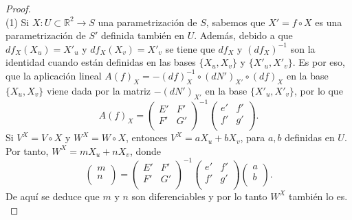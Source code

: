 \begin{proof}	
	${ }$\\
	
	(1)  Si $X : U \subset \mathbb{R}^2 \to S$ una parametrización de $S$, sabemos que $X' = f \circ X$ es una parametrización de $S'$ definida también en $U$. Además, debido a que $df_X(X_u) = X'_{u}$ y $df_X(X_v) = X'_{v}$ se tiene que $df_X$ y $(df_X)^{-1}$ son la identidad cuando están definidas en las bases $\{X_u, X_v \}$ y $\{X'_{u}, X'_{v} \}$. Es por eso, que la aplicación lineal $A(f)_X = -(df)^{-1}_{X} \circ (dN')_{X'} \circ (df)_X$ en la base $\{X_u, X_v \}$ viene dada por la matriz $-(dN')_{X'}$ en la base $\{X'_{u}, X'_{v} \}$, por lo que
	${ }$\\
	\[
		A(f)_X = \left( {\begin{array}{cc}
			E' & F' \\
			F' & G' \\
			\end{array} } \right)^{-1}
		\left( {\begin{array}{cc}
			e' & f' \\
			f' & g' \\
			\end{array} } \right).
	\]
	${ }$\\
	
	Si $V^X = V \circ X$ y $W^X = W \circ X$, entonces $V^X = aX_u + bX_v$, para $a,b$ definidas en $U$. Por tanto, $W^X = mX_u + nX_v$, donde
	${ }$\\
	\[
		\left( {\begin{array}{c}
			m \\
			n \\
			\end{array} } \right)
		=
		\left( {\begin{array}{cc}
			E' & F' \\
			F' & G' \\
			\end{array} } \right)^{-1}
		\left( {\begin{array}{cc}
			e' & f' \\
			f' & g' \\
			\end{array} } \right)
		\left( {\begin{array}{c}
			a \\
			b \\
			\end{array} } \right).
	\]
	${ }$\\
	De aquí se deduce que $m$ y $n$ son diferenciables y por lo tanto $W^X$ también lo es.
	${ }$\\
	

\end{proof}
